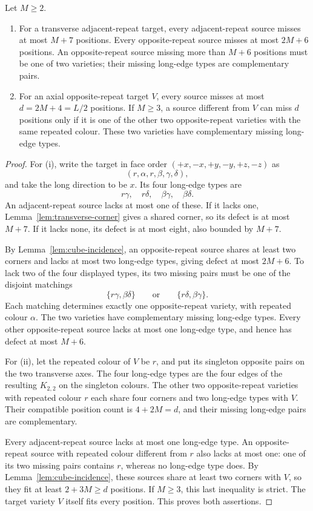 \begin{lemma}\label{lem:rod-compatibility}
Let $M\ge2$.
\begin{enumerate}
\item For a transverse adjacent-repeat target, every adjacent-repeat
source misses at most $M+7$ positions. Every opposite-repeat source
misses at most $2M+6$ positions. An opposite-repeat source missing more
than $M+6$ positions must be one of two varieties; their missing
long-edge types are complementary pairs.
\item For an axial opposite-repeat target $V$, every source misses at
most $d=2M+4=L/2$ positions. If $M\ge3$, a source different from $V$
can miss $d$ positions only if it is one of the other two opposite-repeat
varieties with the same repeated colour. These two varieties have
complementary missing long-edge types.
\end{enumerate}
\end{lemma}

\begin{proof}
For (i), write the target in face order $(+x,-x,+y,-y,+z,-z)$ as
\[
 (r,\alpha,r,\beta,\gamma,\delta),
\]
and take the long direction to be $x$. Its four long-edge types are
\[
 r\gamma,\quad r\delta,\quad \beta\gamma,\quad \beta\delta.
\]
An adjacent-repeat source lacks at most one of these. If it lacks one,
Lemma~\ref{lem:transverse-corner} gives a shared corner, so its defect
is at most $M+7$. If it lacks none, its defect is at most eight, also
bounded by $M+7$.

By Lemma~\ref{lem:cube-incidence}, an opposite-repeat source shares at
least two corners and lacks at most
two long-edge types, giving defect at most $2M+6$. To lack two of the
four displayed types, its two missing pairs must be one of the disjoint
matchings
\[
 \{r\gamma,\beta\delta\}\qquad\text{or}\qquad\{r\delta,\beta\gamma\}.
\]
Each matching determines exactly one opposite-repeat variety, with
repeated colour $\alpha$. The two varieties have complementary missing
long-edge types. Every other opposite-repeat source lacks at most one
long-edge type, and hence has defect at most $M+6$.

For (ii), let the repeated colour of $V$ be $r$, and put its singleton
opposite pairs on the two transverse axes. The four long-edge types are
the four edges of the resulting $K_{2,2}$ on the singleton colours.
The other two opposite-repeat varieties with repeated colour $r$ each
share four corners and two long-edge types with $V$. Their compatible
position count is $4+2M=d$, and their missing long-edge pairs are
complementary.

Every adjacent-repeat source lacks at most one long-edge type. An
opposite-repeat source with repeated colour different from $r$ also
lacks at most one: one of its two missing pairs contains $r$, whereas
no long-edge type does. By Lemma~\ref{lem:cube-incidence}, these sources share at least two
corners with $V$, so they fit at least $2+3M\ge d$ positions. If $M\ge3$, this last
inequality is strict. The target variety $V$ itself fits every position.
This proves both assertions.
\end{proof}

